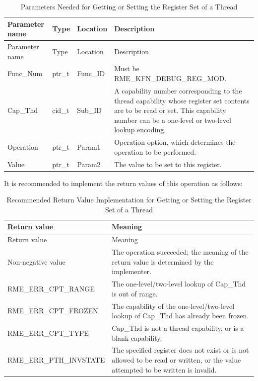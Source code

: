 \begin{xltabular}{\textwidth}{@{}>{\hsize\raggedright\arraybackslash}X>{\hsize\raggedright\arraybackslash}X>{\hsize\raggedright\arraybackslash}X>{\hsize\raggedright\arraybackslash}X@{}}
\caption{Parameters Needed for Getting or Setting the Register Set of a Thread}\label{tab:8-111-get-or-set-thread-register-set-parameters}\\
\toprule
Parameter name & Type & Location & Description\tabularnewline
\endfirsthead
\toprule
Parameter name & Type & Location & Description\tabularnewline
\midrule
\endhead
\bottomrule
\endlastfoot
Func\_Num & ptr\_t & Func\_ID & Must be RME\_KFN\_DEBUG\_REG\_MOD.\tabularnewline
Cap\_Thd & cid\_t & Sub\_ID &
A capability number corresponding to the thread capability whose register set contents are to be read or set. This capability number can be a one-level or two-level lookup encoding.\tabularnewline
Operation & ptr\_t & Param1 &
Operation option, which determines the operation to be performed.\tabularnewline
Value & ptr\_t & Param2 & The value to be set to this register.\tabularnewline
\end{xltabular}
\nopagebreak[4]

\newpage
{}
It is recommended to implement the return values of this operation as follows:

\begin{xltabular}{\textwidth}{@{}>{\hsize\raggedright\arraybackslash}X>{\hsize\raggedright\arraybackslash}X@{}}
\caption{Recommended Return Value Implementation for Getting or Setting the Register Set of a Thread}\label{tab:8-112-get-or-set-thread-register-set-suggested-return-values}\\
\toprule
Return value & Meaning\tabularnewline
\endfirsthead
\toprule
Return value & Meaning\tabularnewline
\midrule
\endhead
\bottomrule
\endlastfoot
    Non-negative value & The operation succeeded; the meaning of the return value is determined by the implementer.\tabularnewline
    RME\_ERR\_CPT\_RANGE & The one-level/two-level lookup of Cap\_Thd is out of range.\tabularnewline
    RME\_ERR\_CPT\_FROZEN & The capability of the one-level/two-level lookup of Cap\_Thd has already been frozen.\tabularnewline
    RME\_ERR\_CPT\_TYPE & Cap\_Thd is not a thread capability, or is a blank capability.\tabularnewline
    RME\_ERR\_PTH\_INVSTATE & The specified register does not exist or is not allowed to be read or written, or the value attempted to be written is invalid.\tabularnewline
\end{xltabular}
\nopagebreak[4]

